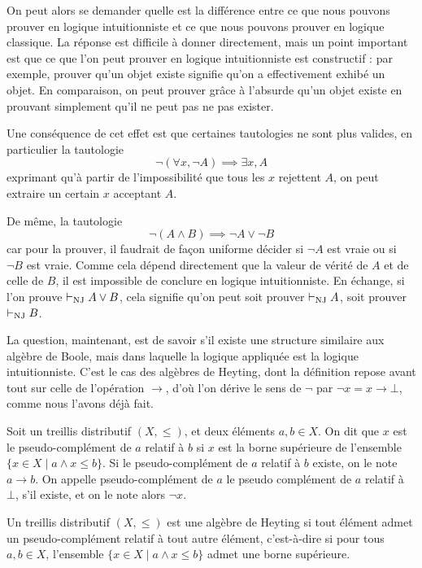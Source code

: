 On peut alors se demander quelle est la différence entre ce que nous pouvons
prouver en logique intuitionniste et ce que nous pouvons prouver en logique
classique. La réponse est difficile à donner directement, mais un point
important est que ce que l'on peut prouver en logique intuitionniste est
constructif : par exemple, prouver qu'un objet existe signifie qu'on a
effectivement exhibé un objet. En comparaison, on peut prouver grâce à l'absurde
qu'un objet existe en prouvant simplement qu'il ne peut pas ne pas exister.

Une conséquence de cet effet est que certaines tautologies ne sont plus valides,
en particulier la tautologie
\[\lnot(\forall x, \lnot A) \implies \exists x, A\]
exprimant qu'à partir de l'impossibilité que tous les $x$ rejettent $A$, on peut
extraire un certain $x$ acceptant $A$.

De même, la tautologie
\[\lnot (A \land B) \implies \lnot A \lor \lnot B\]
car pour la prouver, il faudrait de façon uniforme décider si $\lnot A$ est
vraie ou si $\lnot B$ est vraie. Comme cela dépend directement que la valeur de
vérité de $A$ et de celle de $B$, il est impossible de conclure en logique
intuitionniste. En échange, si l'on prouve $\vdash_{\operatorname{NJ}} A \lor B$, cela signifie qu'on
peut soit prouver $\vdash_{\operatorname{NJ}} A$, soit prouver $\vdash_{\operatorname{NJ}} B$.

La question, maintenant, est de savoir s'il existe une structure similaire aux
algèbre de Boole, mais dans laquelle la logique appliquée est la logique
intuitionniste. C'est le cas des algèbres de Heyting, dont la définition repose
avant tout sur celle de l'opération $\to$, d'où l'on dérive le sens de $\lnot$
par $\lnot x = x \to \bot$, comme nous l'avons déjà fait.

\begin{definition}
  Soit un treillis distributif $(X,\leq)$, et deux éléments $a,b\in X$. On dit
  que $x$ est le pseudo-complément de $a$ relatif à $b$ si $x$ est la borne
  supérieure de l'ensemble $\{x \in X \mid a \land x \leq b\}$. Si le
  pseudo-complément de $a$ relatif à $b$ existe, on le note $a\to b$. On appelle
  pseudo-complément de $a$ le pseudo complément de $a$ relatif à $\bot$, s'il
  existe, et on le note alors $\lnot x$.
\end{definition}

\begin{definition}
  Un treillis distributif $(X,\leq)$ est une algèbre de Heyting si tout élément
  admet un pseudo-complément relatif à tout autre élément, c'est-à-dire si
  pour tous $a,b\in X$, l'ensemble $\{x\in X \mid a \land x \leq b\}$ admet une
  borne supérieure.
\end{definition}

